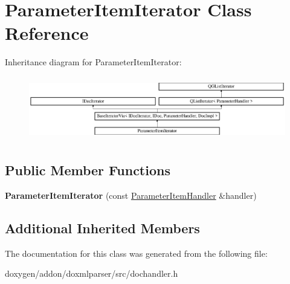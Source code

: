 \hypertarget{class_parameter_item_iterator}{}\section{Parameter\+Item\+Iterator Class Reference}
\label{class_parameter_item_iterator}
Inheritance diagram for Parameter\+Item\+Iterator\+:\begin{figure}[H]
\begin{center}
\leavevmode
\includegraphics[height=2.814070cm]{class_parameter_item_iterator}
\end{center}
\end{figure}
\subsection*{Public Member Functions}
\begin{DoxyCompactItemize}
\item 
\mbox{\label{class_parameter_item_iterator_a1eacf92dd502f70a7b88a3f6735c5feb}} 
{\bfseries Parameter\+Item\+Iterator} (const \mbox{\hyperlink{class_parameter_item_handler}{Parameter\+Item\+Handler}} \&handler)
\end{DoxyCompactItemize}
\subsection*{Additional Inherited Members}


The documentation for this class was generated from the following file\+:\begin{DoxyCompactItemize}
\item 
doxygen/addon/doxmlparser/src/dochandler.\+h\end{DoxyCompactItemize}
